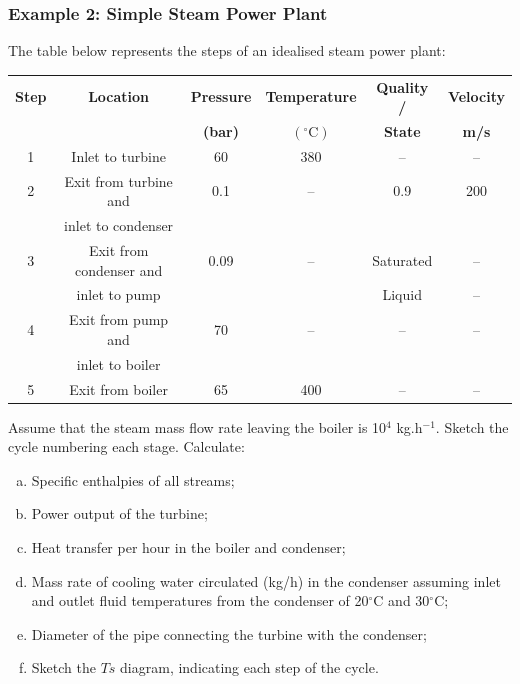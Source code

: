 \documentclass[10pt,compress]{beamer}
\begin{document}
\begin{frame}
 \frametitle{Example 2: Simple Steam Power Plant}
 \scriptsize
   The table below represents the steps of an idealised steam power plant:
    \begin{center}
     \begin{tabular}{||c | c | c | c | c | c ||}
      \hline\hline
       {\bf Step} & {\bf Location}       & {\bf Pressure}  & {\bf Temperature}     & {\bf Quality /}  &{\bf Velocity}    \\
                  &                      & {\bf (bar)}     &{\bf$\left(^{\circ}\text{C}\right)$}& {\bf State} & {\bf m/s} \\
      \hline\hline
          1       & Inlet to turbine     &   60            &   380                 &  --              &       --         \\
      \hline
          2       & Exit from turbine and&   0.1           &    --                 & 0.9              &  200             \\
                  & inlet to condenser   &                 &                       &                  &                  \\ 
      \hline
          3       & Exit from condenser and&  0.09         &  --                   & Saturated        &  --              \\
                  & inlet to pump        &                 &                       & Liquid           &   --             \\
      \hline
          4       & Exit from pump and   &  70             &   --                  &     --           &   --             \\
                  & inlet to boiler      &                 &                       &                  &                  \\
      \hline 
          5       & Exit from boiler     &  65             &  400                  &      --          &    --            \\
           \hline\hline
     \end{tabular}
    \end{center}
    Assume that the steam mass flow rate leaving the boiler is 10$^{4}$ kg.h$^{-1}$. Sketch the cycle numbering each stage. Calculate:
      \begin{enumerate}[(a)]
         \item Specific enthalpies of all streams;
         \item Power output of the turbine;
         \item Heat transfer per hour in the boiler and condenser;
         \item Mass rate of cooling water circulated (kg/h) in the condenser assuming inlet and outlet fluid temperatures from the condenser of 20$^{\circ}$C and 30$^{\circ}$C;
         \item Diameter of the pipe connecting the turbine with the condenser;
         \item Sketch the $Ts$ diagram, indicating each step of the cycle.
    \end{enumerate}
 \normalsize
\end{frame}
\end{document}
